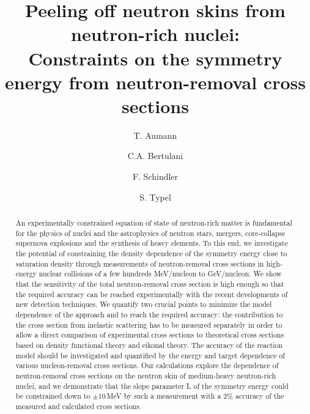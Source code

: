 \documentclass[english,aps,prl,twocolumn,superscriptaddress]{revtex4}
\begin{document}
\title{Peeling off neutron skins from neutron-rich nuclei:\\
Constraints on the symmetry energy from neutron-removal cross sections}

\author{T. Aumann}

\author{C.A. Bertulani}

\author{F. Schindler}

\author{S. Typel}

\begin{abstract}
An experimentally constrained equation of state of neutron-rich matter is fundamental for the physics of nuclei and the astrophysics of neutron stars, mergers, core-collapse supernova explosions and the synthesis of heavy elements. To this end, we investigate the potential of constraining the density dependence of the symmetry energy close to saturation density through measurements of neutron-removal cross sections in high-energy nuclear collisions of a few hundreds MeV/nucleon to GeV/nucleon. We show that the sensitivity of the total neutron-removal cross section is high enough so that the required accuracy can be reached experimentally with the recent developments of new detection techniques. We quantify two crucial points to minimize the model dependence of the approach and to reach the required accuracy: the contribution to the cross section from inelastic scattering has to be measured separately in order to allow a direct comparison of experimental cross sections to theoretical cross sections based on density functional theory and eikonal theory. The accuracy of the reaction model should be investigated and quantified by the energy and target dependence of various nucleon-removal cross sections. Our calculations explore the dependence of neutron-removal cross sections on the neutron skin of medium-heavy neutron-rich nuclei, and we demonstrate that the slope parameter L of the symmetry energy could be constrained down to $\pm10$\,MeV by such a measurement with a 2\% accuracy of the measured and calculated cross sections.
\end{abstract}
\end{document}
